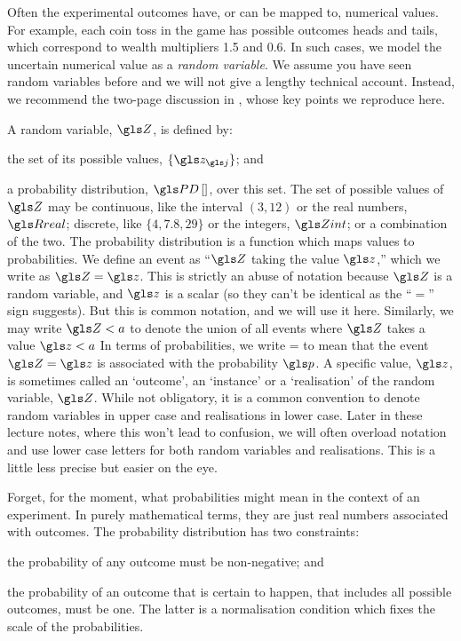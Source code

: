 Often the experimental outcomes have, or can be mapped to, numerical values. For example, each coin toss in the game has possible outcomes heads and tails, which correspond to wealth multipliers 1.5 and 0.6. In such cases, we model the uncertain numerical value as a \textit{random variable}. We assume you have seen random variables before and we will not give a lengthy technical account. Instead, we recommend the two-page discussion in \cite[p.~2]{vanKampen1992}, whose key points we reproduce here.

A random variable, $\Z$, is defined by:
\bi
\item the set of its possible values, $\{\z_\gj\}$; and
\item a probability distribution, $\prob{}$, over this set.
\ei
The set of possible values of $\Z$ may be continuous, like the interval $(3,12)$ or the real numbers, 
$\Rreal$; discrete, like $\{4, 7.8, 29\}$ or the integers, $\Zint$; or a combination 
of the two. The probability distribution is a function which maps values to probabilities. We define an 
event as ``$\Z$ taking the value $\z$,'' which we write as $\Z=\z$. This is strictly an abuse
of notation because $\Z$ is a random variable, and $\z$ is a scalar (so they can't be identical as 
the ``$=$'' sign suggests). But this is common notation, and we will use it here. Similarly, we may write $\Z<a$
to denote the union of all events where $\Z$ takes a value $\z<a$ \etc
In terms of probabilities, we write
\be
\prob{\Z=\z}=\p
\ee
to mean that the event $\Z=\z$ is associated with the probability $\p$. A specific value, $\z$, 
is sometimes called an `outcome', an `instance' or a `realisation' of the random variable, $\Z$. 
While not obligatory, it is a common convention to denote random variables in upper case and 
realisations in lower case. Later in these lecture notes, where this won't lead to confusion, we will 
often overload notation and use lower case letters for both random variables and realisations. 
This is a little less precise but easier on the eye. 

Forget, for the moment, what probabilities might mean in the context of an experiment. In purely 
mathematical terms, they are just real numbers associated with outcomes. The probability 
distribution has two constraints:
\bi
\item the probability of any outcome must be non-negative; and
\item the probability of an outcome that is certain to happen, \ie that includes all possible outcomes, must be one.
\ei
The latter is a normalisation condition which fixes the scale of the probabilities.

